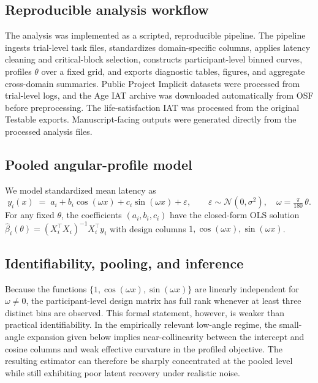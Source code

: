 \documentclass[12pt]{article}
\begin{document}
\subsection{Reproducible analysis workflow}

The analysis was implemented as a scripted, reproducible pipeline. The pipeline ingests trial-level task files, standardizes domain-specific columns, applies latency cleaning and critical-block selection, constructs participant-level binned curves, profiles \(\theta\) over a fixed grid, and exports diagnostic tables, figures, and aggregate cross-domain summaries. Public Project Implicit datasets were processed from trial-level logs, and the Age IAT archive was downloaded automatically from OSF before preprocessing. The life-satisfaction IAT was processed from the original Testable exports. Manuscript-facing outputs were generated directly from the processed analysis files.

\subsection{Pooled angular-profile model}
We model standardized mean latency as
\begin{equation}
y_i(x)\;=\;a_i + b_i\cos(\omega x) + c_i\sin(\omega x) + \varepsilon,
\qquad \varepsilon\sim\mathcal{N}(0,\sigma^2),\quad
\omega=\tfrac{\pi}{180}\,\theta.
\end{equation}
For any fixed $\theta$, the coefficients $(a_i,b_i,c_i)$ have the closed-form OLS solution $\hat\beta_i(\theta)=(X_i^\top X_i)^{-1}X_i^\top y_i$ with design columns $1,\cos(\omega x),\sin(\omega x)$.

\subsection{Identifiability, pooling, and inference}

Because the functions $\{1,\cos(\omega x),\sin(\omega x)\}$ are linearly independent for $\omega \neq 0$, the participant-level design matrix has full rank whenever at least three distinct bins are observed. This formal statement, however, is weaker than practical identifiability. In the empirically relevant low-angle regime, the small-angle expansion given below implies near-collinearity between the intercept and cosine columns and weak effective curvature in the profiled objective. The resulting estimator can therefore be sharply concentrated at the pooled level while still exhibiting poor latent recovery under realistic noise.
\end{document}
